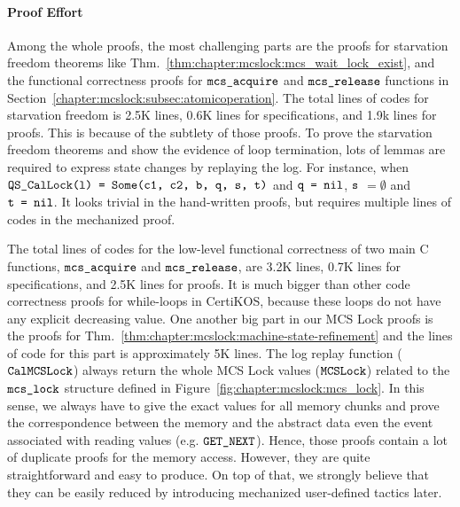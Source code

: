 
\paragraph{Proof Effort}


Among the whole proofs, the most challenging parts are the proofs for starvation 
freedom theorems like Thm.~\ref{thm:chapter:mcslock:mcs_wait_lock_exist}, 
and the functional correctness proofs for ${\mathrm{\texttt{mcs\_acquire}}}$ 
and ${\mathrm{\texttt{mcs\_release}}}$ functions
in Section~\ref{chapter:mcslock:subsec:atomicoperation}.
The total lines of codes for starvation freedom is 2.5K lines, 0.6K lines for specifications, 
and 1.9k lines for proofs. This is because of the subtlety of those proofs. 
To prove the starvation freedom theorems and show the evidence of loop termination,
lots of lemmas are required to express
state changes by replaying the log. For instance, 
when ${\mathrm{\texttt{QS\_CalLock(l) = Some(c1, c2, b, q, s, t)}}}$ 
and ${\mathrm{\texttt{q = nil}}}$, ${\mathrm{\texttt{s}}}$ $=\emptyset$ 
and ${\mathrm{\texttt{t = nil}}}$. It looks trivial in the hand-written proofs, 
but requires multiple lines of codes in the mechanized proof. 

The total lines of codes for the low-level functional correctness
of two main C functions, ${\mathrm{\texttt{mcs\_acquire}}}$ and ${\mathrm{\texttt{mcs\_release}}}$, are 3.2K lines,  
0.7K lines for specifications, and 2.5K lines for proofs.
It is much bigger than other code correctness proofs for while-loops in CertiKOS, 
because these loops do not have any explicit decreasing value.
One another big part in our MCS Lock proofs is the proofs for 
Thm.~\ref{thm:chapter:mcslock:machine-state-refinement} and the lines of code for this part is 
approximately 5K lines. The log replay function (${\mathrm{\texttt{CalMCSLock}}}$) always 
return the whole MCS Lock values (${\mathrm{\texttt{MCSLock}}}$) related 
to the  ${\mathrm{\texttt{mcs\_lock}}}$ structure defined in Figure~\ref{fig:chapter:mcslock:mcs_lock}. 
In this sense, we always have to give the exact values for all memory 
chunks and prove the correspondence between the memory and the abstract 
data even the event associated with reading values (e.g. ${\mathrm{\texttt{GET\_NEXT}}}$).
Hence, those proofs contain a lot of duplicate proofs for the memory access. 
However, they are quite straightforward and easy to produce. 
On top of that, we strongly believe 
that they can be easily reduced by introducing mechanized user-defined tactics later. 

